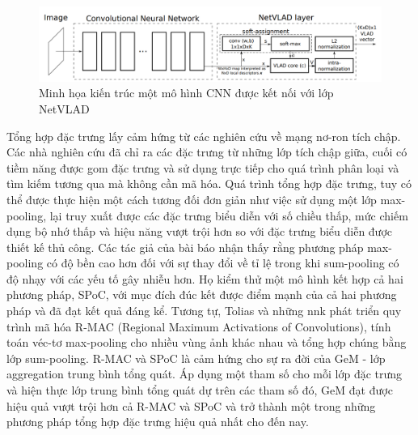 \begin{figure}[h]
    \centering
    \includegraphics[width=\textwidth]{pics/Chapter2/netvladcnn.png}
    \caption{Minh họa kiến trúc một mô hình CNN được kết nối với lớp NetVLAD \cite{arandjelovic2016netvlad}}
\end{figure}

Tổng hợp đặc trưng lấy cảm hứng từ các nghiên cứu về mạng nơ-ron tích chập. Các nhà nghiên cứu đã chỉ ra các đặc trưng từ những lớp tích chập giữa, cuối có tiềm năng được gom đặc trưng và sử dụng trực tiếp cho quá trình phân loại và tìm kiếm tương qua mà không cần mã hóa. Quá trình tổng hợp đặc trưng, tuy có thể được thực hiện một cách tương đối đơn giản như việc sử dụng một lớp max-pooling, lại truy xuất được các đặc trưng biểu diễn với số chiều thấp, mức chiếm dụng bộ nhớ thấp và hiệu năng vượt trội hơn so với đặc trưng biểu diễn được thiết kế thủ công. Các tác giả của bài báo \cite{mousavian2015deep} nhận thấy rằng phương pháp max-pooling có độ bền cao hơn đối với sự thay đổi về tỉ lệ trong khi sum-pooling có độ nhạy với các yếu tố gây nhiễu hơn. Họ kiểm thử một mô hình kết hợp cả hai phương pháp, SPoC, với mục đích đúc kết được điểm mạnh của cả hai phương pháp và đã đạt kết quả đáng kể. Tương tự, Tolias và những nnk \cite{tolias2015particular} phát triển quy trình mã hóa R-MAC (Regional Maximum Activations of Convolutions), tính toán véc-tơ max-pooling cho nhiều vùng ảnh khác nhau và tổng hợp chúng bằng lớp sum-pooling. R-MAC và SPoC là cảm hứng cho sự ra đời của GeM \cite{GeM} - lớp aggregation trung bình tổng quát. Áp dụng một tham số cho mỗi lớp đặc trưng và hiện thực lớp trung bình tổng quát dự trên các tham số đó, GeM đạt được hiệu quả vượt trội hơn cả R-MAC và SPoC và trở thành một trong những phương pháp tổng hợp đặc trưng hiệu quả nhất cho đến nay.